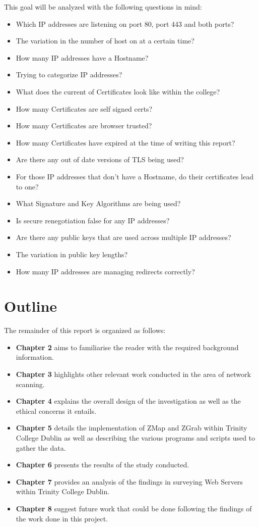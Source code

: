 \documentclass[a4wide,leqno,12pt]{report}
\begin{document}
This goal will be analyzed with the following questions in mind:
\begin{itemize}
  \item Which IP addresses are listening on port 80, port 443 and both ports?
  \item The variation in the number of host on at a certain time?
  \item How many IP addresses have a Hostname?
  \item Trying to categorize IP addresses?
  \item What does the current 
   of Certificates look like within the college?
  \item How many Certificates are self signed certs?
  \item How many Certificates are browser trusted?
   \item How many Certificates have expired at the time of writing this report?
  \item Are there any out of date versions of TLS being used?
  \item For those IP addresses that don't have a Hostname, do their certificates lead to one?
  \item What Signature and Key Algorithms are being used?
  \item Is secure renegotiation false for any IP addresses?
  \item Are there any public keys that are used across multiple IP addresses?
  \item The variation in public key lengths?
  \item How many IP addresses are managing redirects correctly?
 
\end{itemize}
\section{Outline}
The remainder of this report is organized as follows:\\
\begin{itemize}
\item\textbf{Chapter 2} aims to familiarise the reader with the required background information.
\item\textbf{Chapter 3} highlights other relevant work conducted in the area of network scanning.
\item\textbf{Chapter 4} explains the overall design of the investigation as well as the ethical concerns it entails.
\item\textbf{Chapter 5} details the implementation of ZMap and ZGrab within Trinity College Dublin as well as describing the various programs and scripts used to gather the data.
\item\textbf{Chapter 6} presents the results of the study conducted.
\item\textbf{Chapter 7} provides an analysis of the findings in surveying Web Servers within Trinity College Dublin.
\item\textbf{Chapter 8} suggest future work that could be done following the findings of the work done in this project.
\end{itemize}
\end{document}

